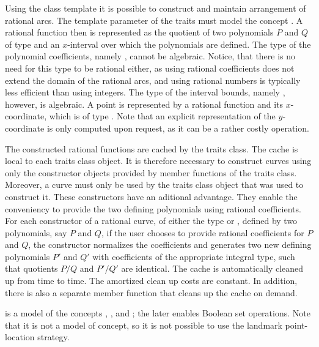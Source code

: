 Using the 
class template it is possible to construct and maintain arrangement
of rational arcs. The template parameter of the traits must model
the concept . A rational function then is
represented as the quotient of two polynomials $P$ and $Q$ of type
 and an $x$-interval over which
the polynomials are defined. The type of the polynomial coefficients,
namely , cannot be algebraic.
Notice, that there is no need for this type to be rational either, as
using rational coefficients does not extend the domain of the rational
arcs, and using rational numbers is typically less efficient than
using integers. The type of the interval bounds, namely
, however, is algebraic. A point is
represented by a rational function and its $x$-coordinate, which is of
type . Note that an explicit
representation of the $y$-coordinate is only computed upon request, as
it can be a rather costly operation.

The constructed rational functions are cached by the traits class. The
cache is local to each traits class object. It is therefore necessary
to construct curves using only the constructor objects provided by
member functions of the traits class.
Moreover, a curve must only be used by the traits class object that
was used to construct it. These constructors have an aditional
advantage. They enable the conveniency to provide the two defining
polynomials using rational coefficients. For each constructor of
a rational curve, of either the type  or
, defined by two polynomials, say $P$ and $Q$,
if the user chooses to provide rational coefficients for $P$ and $Q$,
the constructor normalizes the coefficients and generates two new
defining polynomials $P'$ and $Q'$ with coefficients of the
appropriate integral type, such that quotients $P/Q$ and $P'/Q'$ are 
identical. The cache is automatically cleaned up from time to
time. The amortized clean up costs are constant. In addition, there is
also a separate member function that cleans up the cache on demand.

 is a model
of the concepts ,
, and
; the later enables
Boolean set operations. Note that it is not a model of
 concept, so it is not possible to
use the landmark point-location strategy.

